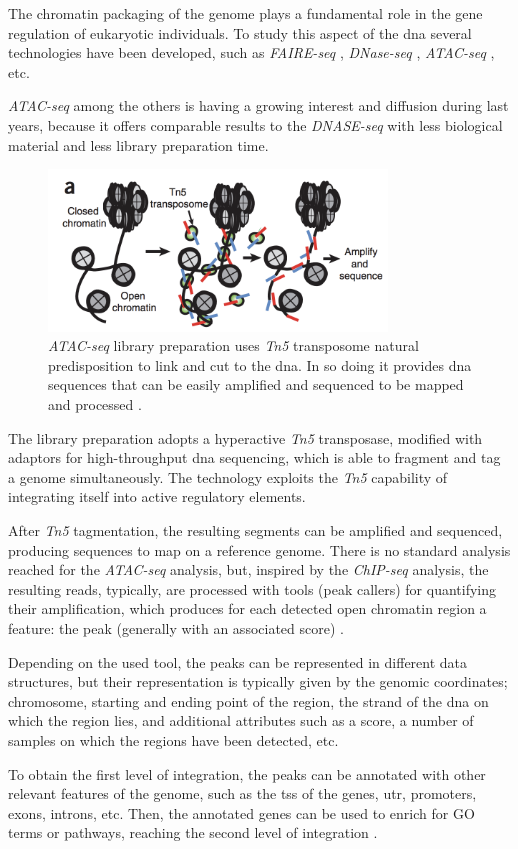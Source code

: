 The chromatin packaging of the genome plays a fundamental role in the gene regulation of eukaryotic individuals.
To study this aspect of the \gls{dna} several technologies have been developed, such as \textit{FAIRE-seq} \cite{Giresi2007}, \textit{DNase-seq} \cite{Winter2013}, \textit{ATAC-seq} \cite{Buenrostro2013}, etc.

\textit{ATAC-seq} among the others is having a growing interest and diffusion during last years, because it offers comparable results to the \textit{DNASE-seq} with less biological material and less library preparation time.

\begin{figure}[h]
\centering
\includegraphics[width=9cm,keepaspectratio]{img/intro/atac.png}
\caption[ATAC-seq experiment]{\textit{ATAC-seq } library preparation uses \textit{Tn5} transposome natural predisposition to link and cut to the \gls{dna}. In so doing it provides \gls{dna} sequences that can be easily amplified and sequenced to be mapped and processed \cite{Buenrostro2013}.}
\label{fig:atacseqexp}
\end{figure}

The library preparation adopts a hyperactive \textit{Tn5} transposase, modified with adaptors for high-throughput  \gls{dna} sequencing, which is able to fragment and tag a genome simultaneously.
The technology exploits the \textit{Tn5} capability of integrating itself into active regulatory elements.

After \textit{Tn5} tagmentation, the resulting segments can be amplified and sequenced, producing sequences to map on a reference genome.
There is no standard analysis reached for the \textit{ATAC-seq} analysis, but, inspired by the \textit{ChIP-seq} analysis, the resulting reads, typically, are processed with tools (peak callers) for quantifying their amplification, which produces for each detected open chromatin region a feature: the peak (generally with an associated score) \cite{Wei2018}. 

Depending on the used tool, the peaks can be represented in different data structures, but their representation is typically given by the genomic coordinates; chromosome, starting and ending point of the region, the strand of the \gls{dna} on which the region lies, and additional attributes such as a score, a number of samples on which the regions have been detected, etc.

To obtain the first level of integration, the peaks can be annotated with other relevant features of the genome, such as the \gls{tss} of the genes, \gls{utr}, promoters, exons, introns, etc.  
Then, the annotated genes can be used to enrich for GO terms or pathways, reaching the second level of integration \cite{righelli2018, Koberstein2018, Ou2018}.




